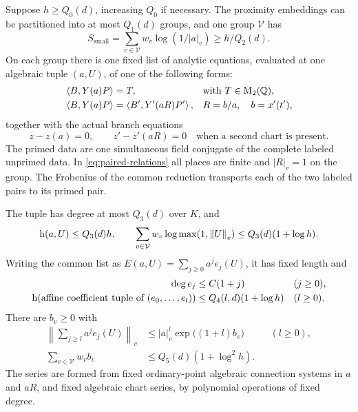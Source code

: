 \begin{proposition}
\label{prop:common-relations}
Suppose $h\ge Q_0(d)$, increasing $Q_0$ if necessary.  The
proximity embeddings can be partitioned into at most $Q_1(d)$
groups, and one group $\mathcal V$ has
\begin{equation}\label{eq:group-smallness}
 S_{\mathrm{small}}=
 \sum_{v\in\mathcal V}w_v\log(1/|a|_v)
       \ge h/Q_2(d).
\end{equation}
On each group there is one fixed list of analytic equations,
evaluated at one algebraic tuple $(a,U)$, of one of the following
forms:
\begin{align}
 \left\langle B,Y(a)P\right\rangle&=T,
       &&\text{with }T\in\mathrm{M}_2(\mathbb Q),
       \label{eq:constant-relations}\\
 \left\langle B,Y(a)P\right\rangle&=\left\langle B',Y'(aR)P'\right\rangle,
       &&R=b/a,\quad b=x'(t'),
       \label{eq:paired-relations}
\end{align}
together with the actual branch equations
\begin{equation}\label{eq:chart-relations}
 z-z(a)=0,
 \qquad z'-z'(aR)=0
 \quad\text{when a second chart is present}.
\end{equation}
The primed data are one simultaneous field conjugate of the
complete labeled unprimed data.  In \eqref{eq:paired-relations}
all places are finite and $|R|_v=1$ on the group.  The Frobenius
of the common reduction transports each of the two labeled
pairs to its primed pair.

The tuple has degree at most $Q_3(d)$ over $K$, and
\begin{equation}\label{eq:common-size}
 \mathrm h\!\left(a,U\right)\le Q_3(d)h,
 \qquad
 \sum_{v\in\mathcal V}w_v\log\max(1,\left\lVert U\right\rVert_v)
       \le Q_3(d)(1+\log h).
\end{equation}
Writing the common list as
$E(a,U)=\sum_{j\ge0}a^j e_j(U)$, it has fixed length and
\begin{equation}\label{eq:coefficient-size}
 \begin{aligned}
 \deg e_j&\le C(1+j) &&(j\ge0),\\
 \mathrm h\!\left(\text{affine coefficient tuple of }(e_0,\ldots,e_l)\right)
       &\le Q_4(l,d)(1+\log h) &&(l\ge0).
 \end{aligned}
\end{equation}
There are $b_v\ge0$ with
\begin{align}
 \left\|\sum_{j\ge l}a^j e_j(U)\right\|_v
       &\le |a|_v^l\exp\bigl((1+l)b_v\bigr)
             &&(l\ge0),\label{eq:arithmetic-tail}\\
 \sum_{v\in\mathcal V}w_v b_v
       &\le Q_5(d)(1+\log^2 h).
             \label{eq:tail-sum}
\end{align}
The series are formed from fixed ordinary-point algebraic
connection systems in $a$ and $aR$, and fixed algebraic chart
series, by polynomial operations of fixed degree.
\end{proposition}

